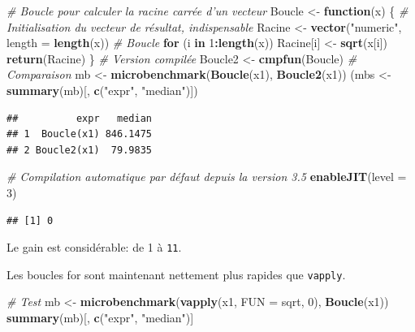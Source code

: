 \documentclass[
  12pt,
  french,
  a4paper,
  extrafontsizes,onecolumn,openright
  ]{memoir}
\newenvironment{Shaded}{\begin{snugshade}}{\end{snugshade}}
\newcommand{\CommentTok}[1]{\textcolor[rgb]{0.56,0.35,0.01}{\textit{#1}}}
\newcommand{\ControlFlowTok}[1]{\textcolor[rgb]{0.13,0.29,0.53}{\textbf{#1}}}
\newcommand{\DataTypeTok}[1]{\textcolor[rgb]{0.13,0.29,0.53}{#1}}
\newcommand{\DecValTok}[1]{\textcolor[rgb]{0.00,0.00,0.81}{#1}}
\newcommand{\KeywordTok}[1]{\textcolor[rgb]{0.13,0.29,0.53}{\textbf{#1}}}
\newcommand{\NormalTok}[1]{#1}
\newcommand{\OperatorTok}[1]{\textcolor[rgb]{0.81,0.36,0.00}{\textbf{#1}}}
\newcommand{\StringTok}[1]{\textcolor[rgb]{0.31,0.60,0.02}{#1}}
\begin{document}
\begin{Shaded}
\begin{Highlighting}[]
\CommentTok{# Boucle pour calculer la racine carrée d'un vecteur}
\NormalTok{Boucle <-}\StringTok{ }\ControlFlowTok{function}\NormalTok{(x) \{}
    \CommentTok{# Initialisation du vecteur de résultat, indispensable}
\NormalTok{    Racine <-}\StringTok{ }\KeywordTok{vector}\NormalTok{(}\StringTok{"numeric"}\NormalTok{, }\DataTypeTok{length =} \KeywordTok{length}\NormalTok{(x))}
    \CommentTok{# Boucle}
    \ControlFlowTok{for}\NormalTok{ (i }\ControlFlowTok{in} \DecValTok{1}\OperatorTok{:}\KeywordTok{length}\NormalTok{(x)) Racine[i] <-}\StringTok{ }\KeywordTok{sqrt}\NormalTok{(x[i])}
    \KeywordTok{return}\NormalTok{(Racine)}
\NormalTok{\}}
\CommentTok{# Version compilée}
\NormalTok{Boucle2 <-}\StringTok{ }\KeywordTok{cmpfun}\NormalTok{(Boucle)}
\CommentTok{# Comparaison}
\NormalTok{mb <-}\StringTok{ }\KeywordTok{microbenchmark}\NormalTok{(}\KeywordTok{Boucle}\NormalTok{(x1), }\KeywordTok{Boucle2}\NormalTok{(x1))}
\NormalTok{(mbs <-}\StringTok{ }\KeywordTok{summary}\NormalTok{(mb)[, }\KeywordTok{c}\NormalTok{(}\StringTok{"expr"}\NormalTok{, }\StringTok{"median"}\NormalTok{)])}
\end{Highlighting}
\end{Shaded}

\begin{verbatim}
##          expr   median
## 1  Boucle(x1) 846.1475
## 2 Boucle2(x1)  79.9835
\end{verbatim}

\begin{Shaded}
\begin{Highlighting}[]
\CommentTok{# Compilation automatique par défaut depuis la version 3.5}
\KeywordTok{enableJIT}\NormalTok{(}\DataTypeTok{level =} \DecValTok{3}\NormalTok{)}
\end{Highlighting}
\end{Shaded}

\begin{verbatim}
## [1] 0
\end{verbatim}

\normalsize
Le gain est considérable: de 1 à \texttt{11}.

Les boucles for sont maintenant nettement plus rapides que \texttt{vapply}.

\scriptsize

\begin{Shaded}
\begin{Highlighting}[]
\CommentTok{# Test}
\NormalTok{mb <-}\StringTok{ }\KeywordTok{microbenchmark}\NormalTok{(}\KeywordTok{vapply}\NormalTok{(x1, }\DataTypeTok{FUN =}\NormalTok{ sqrt, }\DecValTok{0}\NormalTok{), }\KeywordTok{Boucle}\NormalTok{(x1))}
\KeywordTok{summary}\NormalTok{(mb)[, }\KeywordTok{c}\NormalTok{(}\StringTok{"expr"}\NormalTok{, }\StringTok{"median"}\NormalTok{)]}
\end{Highlighting}
\end{Shaded}
\end{document}

